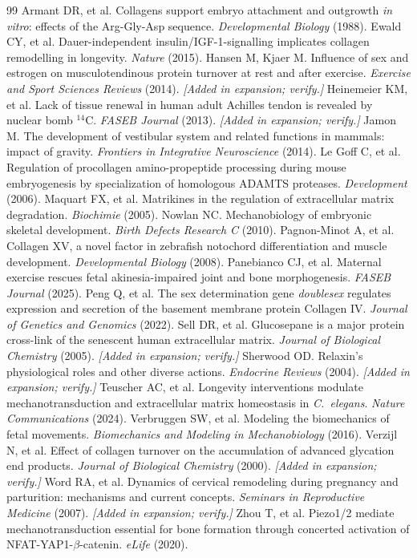 \documentclass[11pt,a4paper]{article}
\theoremstyle{plain}
\theoremstyle{definition}
\theoremstyle{remark}
\begin{document}
\begin{thebibliography}{99}
\small
{} Armant DR, et al. Collagens support embryo attachment and outgrowth \emph{in vitro}: effects of the Arg-Gly-Asp sequence. \emph{Developmental Biology} (1988).
 Ewald CY, et al. Dauer-independent insulin/IGF-1-signalling implicates collagen remodelling in longevity. \emph{Nature} (2015).
 Hansen M, Kjaer M. Influence of sex and estrogen on musculotendinous protein turnover at rest and after exercise. \emph{Exercise and Sport Sciences Reviews} (2014). \emph{[Added in expansion; verify.]}
 Heinemeier KM, et al. Lack of tissue renewal in human adult Achilles tendon is revealed by nuclear bomb $^{14}$C. \emph{FASEB Journal} (2013). \emph{[Added in expansion; verify.]}
 Jamon M. The development of vestibular system and related functions in mammals: impact of gravity. \emph{Frontiers in Integrative Neuroscience} (2014).
 Le Goff C, et al. Regulation of procollagen amino-propeptide processing during mouse embryogenesis by specialization of homologous ADAMTS proteases. \emph{Development} (2006).
 Maquart FX, et al. Matrikines in the regulation of extracellular matrix degradation. \emph{Biochimie} (2005).
 Nowlan NC. Mechanobiology of embryonic skeletal development. \emph{Birth Defects Research C} (2010).
 Pagnon-Minot A, et al. Collagen XV, a novel factor in zebrafish notochord differentiation and muscle development. \emph{Developmental Biology} (2008).
 Panebianco CJ, et al. Maternal exercise rescues fetal akinesia-impaired joint and bone morphogenesis. \emph{FASEB Journal} (2025).
 Peng Q, et al. The sex determination gene \emph{doublesex} regulates expression and secretion of the basement membrane protein Collagen IV. \emph{Journal of Genetics and Genomics} (2022).
 Sell DR, et al. Glucosepane is a major protein cross-link of the senescent human extracellular matrix. \emph{Journal of Biological Chemistry} (2005). \emph{[Added in expansion; verify.]}
 Sherwood OD. Relaxin's physiological roles and other diverse actions. \emph{Endocrine Reviews} (2004). \emph{[Added in expansion; verify.]}
 Teuscher AC, et al. Longevity interventions modulate mechanotransduction and extracellular matrix homeostasis in \emph{C.\ elegans}. \emph{Nature Communications} (2024).
 Verbruggen SW, et al. Modeling the biomechanics of fetal movements. \emph{Biomechanics and Modeling in Mechanobiology} (2016).
 Verzijl N, et al. Effect of collagen turnover on the accumulation of advanced glycation end products. \emph{Journal of Biological Chemistry} (2000). \emph{[Added in expansion; verify.]}
 Word RA, et al. Dynamics of cervical remodeling during pregnancy and parturition: mechanisms and current concepts. \emph{Seminars in Reproductive Medicine} (2007). \emph{[Added in expansion; verify.]}
 Zhou T, et al. Piezo1/2 mediate mechanotransduction essential for bone formation through concerted activation of NFAT-YAP1-$\beta$-catenin. \emph{eLife} (2020).
\end{thebibliography}
\end{document}
